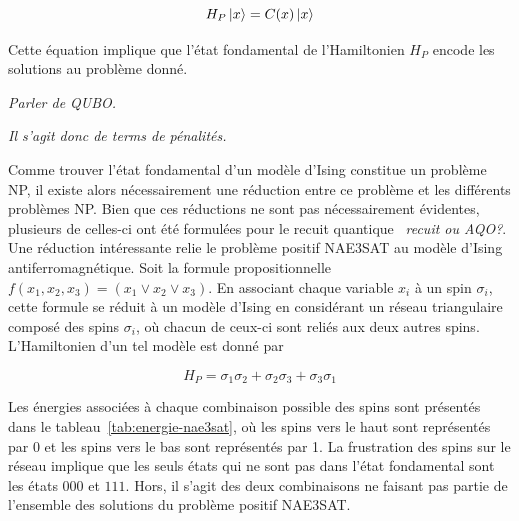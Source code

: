 \begin{equation}
    H_{P} \ket{x} = C(x) \ket{x}
\end{equation}

Cette équation implique que l'état fondamental de l'Hamiltonien $H_{P}$ encode les solutions au problème donné. 

\textcolor{mydarkred}{\textit{Parler de QUBO.}}

\textcolor{mydarkred}{\textit{Il s'agit donc de terms de pénalités.}}


Comme trouver l'état fondamental d'un modèle d'Ising constitue un problème NP, il existe alors nécessairement une réduction entre ce problème et les différents problèmes NP. Bien que ces réductions ne sont pas nécessairement évidentes, plusieurs de celles-ci ont été formulées pour le recuit quantique~\cite{lucasIsingFormulationsMany2014,lodewijksMappingNPhardNPcomplete2020} \textcolor{mydarkred}{\textit{recuit ou AQO?}}. Une réduction intéressante relie le problème positif NAE3SAT au modèle d'Ising antiferromagnétique. Soit la formule propositionnelle $f(x_{1}, x_{2}, x_{3}) = (x_{1} \lor x_{2} \lor x_{3})$. En associant chaque variable $x_{i}$ à un spin $\sigma_{i}$, cette formule se réduit à un modèle d'Ising en considérant un réseau triangulaire composé des spins $\sigma_{i}$, où chacun de ceux-ci sont reliés aux deux autres spins. L'Hamiltonien d'un tel modèle est donné par

\begin{equation}
    H_{P} = \sigma_{1}\sigma_{2} + \sigma_{2}\sigma_{3} + \sigma_{3}\sigma_{1}
\end{equation}

Les énergies associées à chaque combinaison possible des spins sont présentés dans le tableau~\ref{tab:energie-nae3sat}, où les spins vers le haut sont représentés par 0 et les spins vers le bas sont représentés par 1. La frustration des spins sur le réseau implique que les seuls états qui ne sont pas dans l'état fondamental sont les états $000$ et $111$. Hors, il s'agit des deux combinaisons ne faisant pas partie de l'ensemble des solutions du problème positif NAE3SAT.


